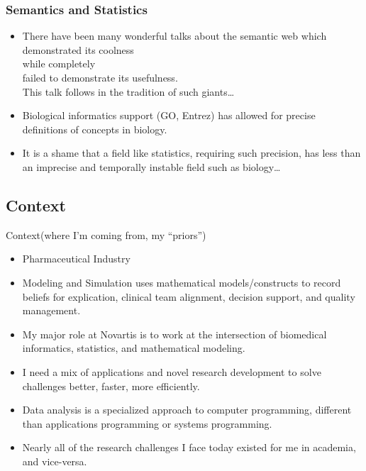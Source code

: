 \documentclass{beamer}
\begin{document}
\begin{frame}
  \frametitle{Semantics and Statistics}
  \begin{itemize}
  \item
    There have been many wonderful talks about the semantic web which \\
    \alert{demonstrated its coolness} \\
    while completely \\
    \alert{failed to demonstrate its usefulness}.\\
    This talk follows in the tradition of such giants\ldots{}
    
  \item 
    Biological informatics support (GO, Entrez) has allowed for
    precise definitions of concepts in biology.

  \item It is a shame that a field like statistics, requiring such
    precision, has less than an imprecise and temporally instable
    field such as biology\ldots
  \end{itemize}
\end{frame}


\subsection{Context}

\begin{frame}{Context}{(where I'm coming from, my ``priors'')}
  \begin{itemize}
  \item Pharmaceutical Industry
  \item Modeling and Simulation uses mathematical models/constructs to
    record beliefs for explication, clinical team alignment, decision
    support, and quality management.
  \item My major role at Novartis is to work at the intersection of
    biomedical informatics, statistics, and mathematical modeling.
  \item I need a mix of applications and novel research development to
    solve challenges better, faster, more efficiently.
  \item Data analysis is a specialized approach to computer
    programming, \alert{different} than applications programming or
    systems programming.
  \item \alert{Nearly all of the research challenges I face today
      existed for me in academia, and vice-versa.}
  \end{itemize}
\end{frame}
\end{document}
